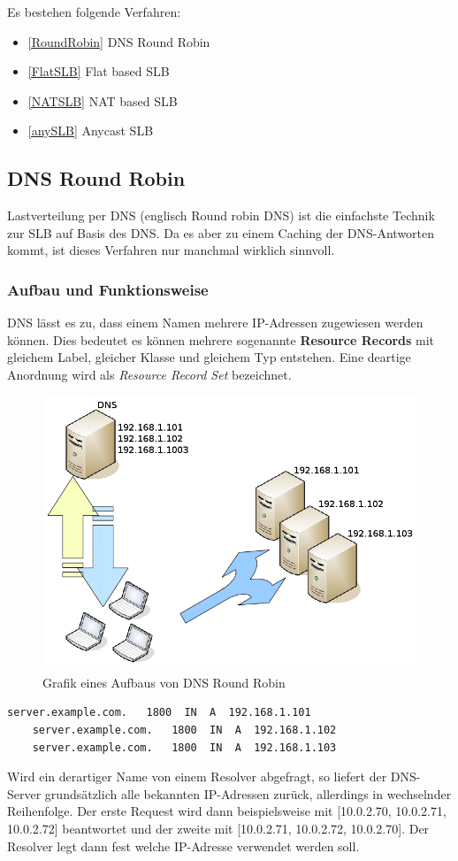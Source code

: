 Es bestehen folgende Verfahren:
\begin{itemize}
	\item \ref{RoundRobin} DNS Round Robin
	\item \ref{FlatSLB} Flat based SLB
	\item \ref{NATSLB} NAT based SLB
	\item \ref{anySLB} Anycast SLB
\end{itemize}

\newpage
\subsection{DNS Round Robin}\cite{LastverteilungPerDNS}
\label{RoundRobin}

Lastverteilung per DNS (englisch Round robin DNS) ist die einfachste Technik zur SLB auf Basis des DNS. Da es aber zu einem Caching der DNS-Antworten kommt, ist dieses Verfahren nur manchmal wirklich sinnvoll.

\subsubsection{Aufbau und Funktionsweise}\cite{RoundRobinDNS}
DNS lässt es zu, dass einem Namen mehrere IP-Adressen zugewiesen werden können. Dies bedeutet es können mehrere sogenannte \textbf{Resource Records} mit gleichem Label, gleicher Klasse und gleichem Typ entstehen. Eine deartige Anordnung wird als \textit{Resource Record Set} bezeichnet.

\begin{figure}[!h]
	\begin{center}
		\includegraphics[width=0.5\linewidth]{images/RR-DNS}
		\caption{Grafik eines Aufbaus von DNS Round Robin}
		\label{broker}
	\end{center}
\end{figure}
\begin{center}

\begin{lstlisting}[caption=DNS Round Robin Example]
    server.example.com.   1800  IN  A  192.168.1.101
    server.example.com.   1800  IN  A  192.168.1.102
    server.example.com.   1800  IN  A  192.168.1.103
\end{lstlisting}
\end{center}
Wird ein derartiger Name von einem Resolver abgefragt, so liefert der DNS-Server grundsätzlich alle bekannten IP-Adressen zurück, allerdings in wechselnder Reihenfolge. Der erste Request wird dann beispielsweise mit [10.0.2.70, 10.0.2.71, 10.0.2.72] beantwortet und der zweite mit [10.0.2.71, 10.0.2.72, 10.0.2.70]. Der Resolver legt dann fest welche IP-Adresse verwendet werden soll.


